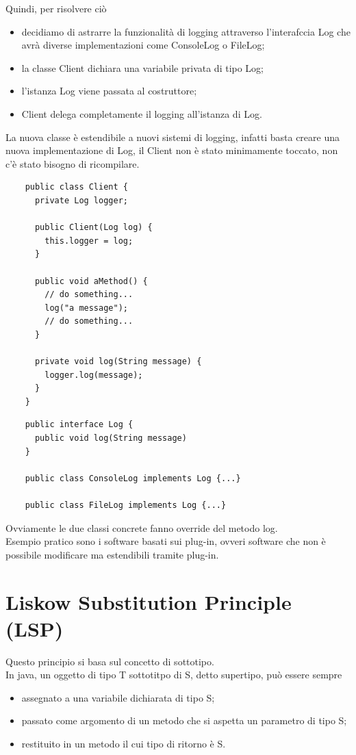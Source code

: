 \newpage
Quindi, per risolvere ciò
\begin{itemize}
  \item decidiamo di astrarre la funzionalità di logging attraverso l'interafccia Log che avrà diverse implementazioni come ConsoleLog o FileLog;
  \item la classe Client dichiara una variabile privata di tipo Log;
  \item l’istanza Log viene passata al costruttore;
  \item Client delega completamente il logging all’istanza di Log.
\end{itemize}

La nuova classe è estendibile a nuovi sistemi di logging, infatti basta creare una nuova implementazione di Log, il Client non è stato minimamente toccato, non c'è stato bisogno di ricompilare.

\begin{multicols}{2}
  \begin{lstlisting}
    public class Client {
      private Log logger;
        
      public Client(Log log) {
        this.logger = log;
      }
        
      public void aMethod() {
        // do something...
        log("a message");
        // do something...
      }
    
      private void log(String message) {
        logger.log(message);
      }
    }
  \end{lstlisting}
  \columnbreak
  \begin{lstlisting}
    public interface Log {
      public void log(String message)
    }

    public class ConsoleLog implements Log {...}

    public class FileLog implements Log {...}
  \end{lstlisting}  
\end{multicols}
Ovviamente le due classi concrete fanno override del metodo log.\\
Esempio pratico sono i software basati sui plug-in, ovveri software che non è possibile modificare ma estendibili tramite plug-in.\\

\section{Liskow Substitution Principle (LSP)}
 
Questo principio si basa sul concetto di sottotipo.\\
In java, un oggetto di tipo T sottotitpo di S, detto supertipo, può essere sempre
\begin{itemize}
  \item assegnato a una variabile dichiarata di tipo S;
  \item passato come argomento di un metodo che si aspetta un parametro di tipo S;
  \item restituito in un metodo il cui tipo di ritorno è S.
\end{itemize}

